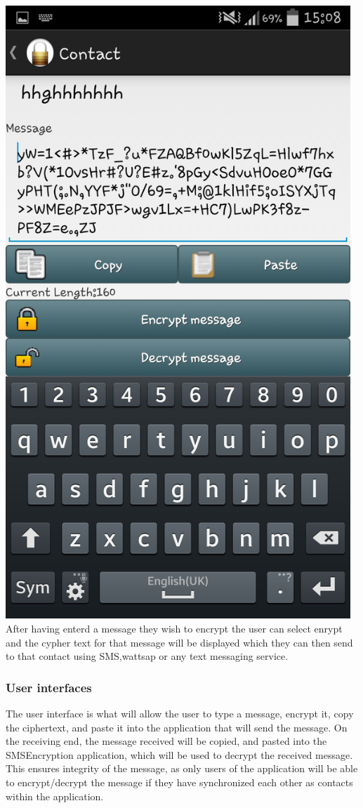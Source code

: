 \begin{center}
 \includegraphics[width=13cm]{screenshots/normal/5_ContactPostEncrypt.png}
 After having enterd a message they wish to encrypt the user can select enrypt and the cypher text for that message will be displayed which they can then send to that contact using SMS,wattsap or any text messaging service.
\end{center}
\subsubsection{User interfaces}
 The user interface is what will allow the user to type a message, encrypt it, copy the ciphertext, and paste it into the application that will send the message. On the receiving end, the message received will be copied, and pasted into the SMSEncryption application, which will be used to decrypt the received message. This ensures integrity of the message, as only users of the application will be able to encrypt/decrypt the message if they have synchronized each other as contacts within the application.
